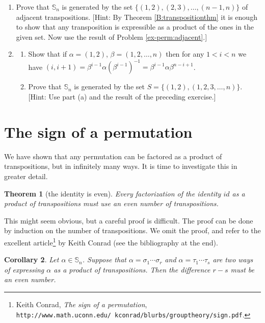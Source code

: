 \documentclass[11pt]{article}
\newenvironment{problems}
{
 \begin{enumerate}[topsep=1pt,itemsep=0pt,parsep=2pt,leftmargin=0.6cm,%
 label={\arabic*.}, ref=\arabic*] \small
}
{
 \end{enumerate}
}
\newtheorem{thm}{Theorem}[section]
\newtheorem{cor}[thm]{Corollary}
\theoremstyle{definition}
\newcommand{\Sym}{\mathbb{S}}
\begin{document}
\begin{problems}
\item \label{ex-perm:adjgen} Prove that $\Sym_n$ is generated by the
  set $\{ (1,2), (2,3), \dots, (n-1,n) \}$ of adjacent transpositions.
  [Hint: By Theorem \ref{B:transpositionthm} it is enough to show that
    any transposition is expressible as a product of the ones in the
    given set. Now use the result of Problem \ref{ex-perm:adjacent}.]

\item  \label{ex-perm:twogen} 
\begin{enumerate}
\item Show that if $\alpha = (1,2)$, $\beta = (1,2,\dots,n)$ then for
  any $1 < i <n$ we have $(i,i+1) = \beta^{i-1} \alpha
  (\beta^{i-1})^{-1} = \beta^{i-1} \alpha\beta^{n-i+1}$. 

\item  Prove that $\Sym_n$ is generated by the set $S = \{ (1,2),
(1,2,3,\dots,n) \}$. [Hint: Use part (a) and the result of the
  preceding exercise.]
\end{enumerate}



\end{problems}



\newpage\section{The sign of a permutation}\noindent
We have shown that any permutation can be factored as a product of
transpositions, but in infinitely many ways. It is time to investigate
this in greater detail.

\begin{thm}[the identity is even]
  Every factorization of the identity $id$ as a product of
  transpositions must use an even number of transpositions.
\end{thm}

This might seem obvious, but a careful proof is difficult. The proof
can be done by induction on the number of transpositions. We omit the
proof, and refer to the excellent article\footnote{Keith Conrad,
  \emph{The sign of a permutation},\\
  \texttt{http://www.math.uconn.edu/~kconrad/blurbs/grouptheory/sign.pdf}.}
by Keith Conrad (see the bibliography at the end).

\begin{cor}
  Let $\alpha \in \Sym_n$. Suppose that $\alpha = \sigma_1 \cdots
  \sigma_r$ and $\alpha = \tau_1 \cdots \tau_s$ are two ways of
  expressing $\alpha$ as a product of transpositions. Then the
  difference $r-s$ must be an even number.
\end{cor}
\end{document}
